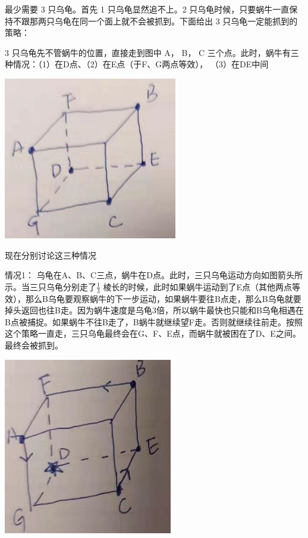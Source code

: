 \documentclass{article}
\begin{document}
最少需要 3 只乌龟。首先 1 只乌龟显然追不上。2 只乌龟时候，只要蜗牛一直保持不跟那两只乌龟在同一个面上就不会被抓到。下面给出 3 只乌龟一定能抓到的策略：

3 只乌龟先不管蜗牛的位置，直接走到图中 A， B， C 三个点。此时，蜗牛有三种情况：（1）在D点、（2）在E点（于F、G两点等效）， （3）在DE中间

\includegraphics[scale=0.5]{cube01.png}

\vspace{60pt}

现在分别讨论这三种情况

情况1： 乌龟在A、B、C三点，蜗牛在D点。此时，三只乌龟运动方向如图箭头所示。当三只乌龟分别走了$\frac{1}{3}$ 棱长的时候，此时如果蜗牛运动到了E点（其他两点等效），那么B乌龟要观察蜗牛的下一步运动，如果蜗牛要往B点走，那么B乌龟就要掉头返回也往B走。因为蜗牛速度是乌龟3倍，所以蜗牛最快也只能和B乌龟相遇在B点被捕捉。如果蜗牛不往B走了，B蜗牛就继续望F走。否则就继续往前走。按照这个策略一直走，三只乌龟最终会在G、F、E点，而蜗牛就被困在了D、E之间。最终会被抓到。

\includegraphics[scale=0.5]{cube02.png}
\end{document}
